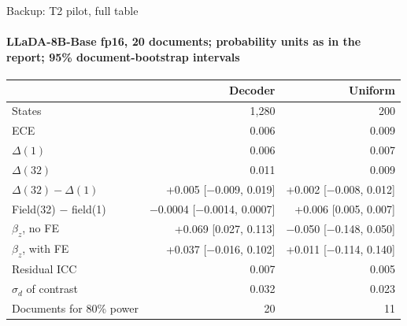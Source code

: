 \documentclass[aspectratio=169,10pt,t]{beamer}
\newcommand{\ci}[1]{{\color{ink2}\scriptsize[#1]}}
\begin{document}
\begin{frame}{Backup: T2 pilot, full table}
  \framesubtitle{LLaDA-8B-Base fp16, 20 documents; probability units as in the report; 95\% document-bootstrap intervals}
  \vspace{1.5mm}
  \centering
  \footnotesize
  \renewcommand{\arraystretch}{1.06}
  \begin{tabular}{@{}l r r@{}}
    \toprule
    & {\color{ink2}Decoder} & {\color{ink2}Uniform} \\
    \midrule
    States                        & 1,280 & 200 \\
    ECE                           & 0.006 & 0.009 \\
    $\Delta(1)$                   & 0.006 & 0.007 \\
    $\Delta(32)$                  & 0.011 & 0.009 \\
    $\Delta(32) - \Delta(1)$      & +0.005 \ci{−0.009, 0.019} & +0.002 \ci{−0.008, 0.012} \\
    Field(32) $-$ field(1)        & −0.0004 \ci{−0.0014, 0.0007} & +0.006 \ci{0.005, 0.007} \\
    $\beta_z$, no FE              & +0.069 \ci{0.027, 0.113} & −0.050 \ci{−0.148, 0.050} \\
    $\beta_z$, with FE            & +0.037 \ci{−0.016, 0.102} & +0.011 \ci{−0.114, 0.140} \\
    Residual ICC                  & 0.007 & 0.005 \\
    $\sigma_d$ of contrast        & 0.032 & 0.023 \\
    Documents for 80\% power      & 20 & 11 \\
    \bottomrule
  \end{tabular}
\end{frame}
\end{document}
